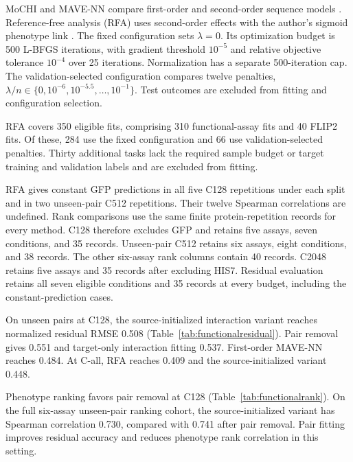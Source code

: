 \documentclass{llncs}
\begin{document}
MoCHI and MAVE-NN compare first-order and second-order sequence models \citep{faure2024,tareen2022}. Reference-free analysis (RFA) uses second-order effects with the author's sigmoid phenotype link \citep{park2024}. The fixed configuration sets $\lambda=0$. Its optimization budget is 500 L-BFGS iterations, with gradient threshold $10^{-5}$ and relative objective tolerance $10^{-4}$ over 25 iterations. Normalization has a separate 500-iteration cap. The validation-selected configuration compares twelve penalties, $\lambda/n\in\{0,10^{-6},10^{-5.5},\ldots,10^{-1}\}$. Test outcomes are excluded from fitting and configuration selection.

RFA covers 350 eligible fits, comprising 310 functional-assay fits and 40 FLIP2 fits. Of these, 284 use the fixed configuration and 66 use validation-selected penalties. Thirty additional tasks lack the required sample budget or target training and validation labels and are excluded from fitting.

RFA gives constant GFP predictions in all five C128 repetitions under each split and in two unseen-pair C512 repetitions. Their twelve Spearman correlations are undefined. Rank comparisons use the same finite protein-repetition records for every method. C128 therefore excludes GFP and retains five assays, seven conditions, and 35 records. Unseen-pair C512 retains six assays, eight conditions, and 38 records. The other six-assay rank columns contain 40 records. C2048 retains five assays and 35 records after excluding HIS7. Residual evaluation retains all seven eligible conditions and 35 records at every budget, including the constant-prediction cases.

On unseen pairs at C128, the source-initialized interaction variant reaches normalized residual RMSE 0.508 (Table~\ref{tab:functionalresidual}). Pair removal gives 0.551 and target-only interaction fitting 0.537. First-order MAVE-NN reaches 0.484. At C-all, RFA reaches 0.409 and the source-initialized variant 0.448.

Phenotype ranking favors pair removal at C128 (Table~\ref{tab:functionalrank}). On the full six-assay unseen-pair ranking cohort, the source-initialized variant has Spearman correlation 0.730, compared with 0.741 after pair removal. Pair fitting improves residual accuracy and reduces phenotype rank correlation in this setting.
\end{document}
